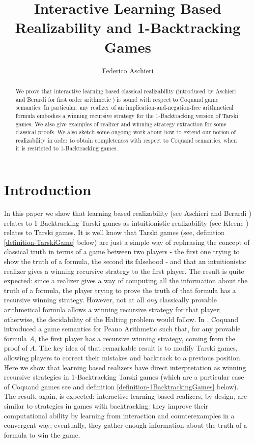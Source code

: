 \documentclass[copyright,creativecommons]{eptcs}
\title{Interactive Learning Based Realizability and 1-Backtracking Games}
\author{Federico Aschieri
\institute{Dipartimento di Informatica\\
Universit\`a di Torino\\ Italy}
\institute{School of Electronic Engineering and Computer Science\\
Queen Mary, University of London\\
UK}
}
\begin{document}
\maketitle

\begin{abstract}  We prove that interactive learning based classical realizability (introduced by Aschieri and Berardi for first order arithmetic \cite{Aschieri}) is sound with respect to Coquand game semantics. In particular, any realizer of an implication-and-negation-free arithmetical formula embodies a winning recursive strategy for the 1-Backtracking version of Tarski games. We also give examples of realizer and winning strategy extraction for some classical proofs. We also sketch some ongoing work about how to extend our notion of realizability in order to obtain completeness with respect to Coquand semantics, when it is restricted to 1-Backtracking games.
 \end{abstract}

\section{Introduction}

In this paper we show that learning based realizability (see Aschieri and Berardi \cite{Aschieri}) relates to 1-Backtracking Tarski games as intuitionistic realizability (see Kleene \cite{Kleene}) relates to Tarski games. It is well know that Tarski games (see, definition \ref{definition-TarskiGame} below) are just a simple way of rephrasing the concept of classical truth in terms of a game between two players - the first one trying to show the truth of a formula, the second its falsehood - and that an intuitionistic realizer gives a winning recursive strategy to the first player. The result is quite expected: since a realizer gives a way of computing all the information about the truth of a formula, the player trying to prove the truth of that formula has a recursive winning strategy. However, not at all \emph{any} classically provable arithmetical formula allows a winning recursive strategy for that player; otherwise, the decidability of the Halting problem would follow. In \cite{Coquand}, Coquand introduced a game semantics for Peano Arithmetic such that, for any provable formula $A$, the first player has a recursive winning strategy, coming from the proof of $A$. The key idea of that remarkable result is to modify Tarski games, allowing players to correct their mistakes and backtrack to a previous position. Here we show that  learning based realizers have direct interpretation as winning recursive strategies in 1-Backtracking Tarski games (which are a particular case of Coquand games see \cite{BerCoq} and definition \ref{definition-1BacktrackingGames} below). The result, again, is expected: interactive learning based realizers, by design, are similar to strategies in games with backtracking: they improve their computational ability by learning from interaction and counterexamples in a convergent way; eventually, they gather enough information about the truth of a formula to win the game. 
\end{document}
